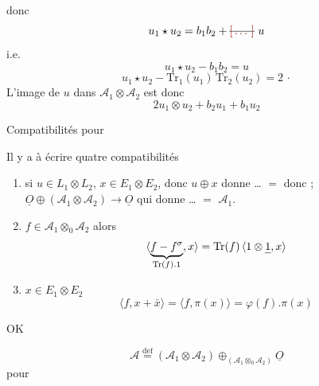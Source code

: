 \documentclass[11pt,a4paper]{article}
\begin{document}
donc
\[
u_1 \star u_2 = b_1 b_2 + \text{\struck{\ill{}}}\ u
\]
i.e.
\[
\boxed{u_1 \star u_2 - b_1 b_2 = u}
\]
\[
u_1 \star u_2 - \mathrm{Tr}_1(u_1)\,\mathrm{Tr}_2(u_2) = 2 \,\cdot
\]
L'image de $u$ dans $\mathcal{A}_1 \otimes \mathcal{A}_2$ est donc
\[
\boxed{2 u_1 \otimes u_2 + b_2 u_1 + b_1 u_2}
\]

Compatibilités pour




Il y a à écrire quatre compatibilités
\begin{enumerate}
\item[1°)] si $u \in L_1 \otimes L_2$, $x \in E_1 \otimes E_2$, donc $u \oplus x$ donne … $=$ donc ;
$\underline{O} \oplus (\mathcal{A}_1 \otimes \mathcal{A}_2) \to \underline{O}$ qui donne … $=$  $\mathcal{A}_1$.
\item[2°)] $f \in \mathcal{A}_1 \otimes_0 \mathcal{A}_2$ alors
\[
\langle \underbrace{f - f^{\sigma}}_{\mathrm{Tr}(f).1}, x \rangle = \mathrm{Tr}(f)\, \langle 1 \otimes \text{\uncertain{$1$}}, x \rangle
\]
\item[3°)] $x \in E_1 \otimes E_2$
\[
\langle f, x + \bar x \rangle = \langle f, \pi(x) \rangle = \varphi(f) . \pi(x)
\]
\end{enumerate}

OK

\[
\mathcal{A} \overset{\mathrm{def}}{=} (\mathcal{A}_1 \otimes \mathcal{A}_2) \oplus_{(\mathcal{A}_1 \otimes_0 \mathcal{A}_2)} \underline{O}
\]
pour
\end{document}
